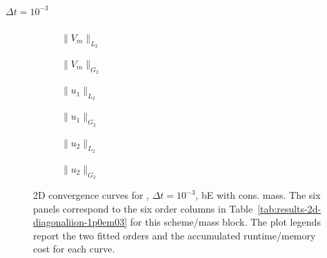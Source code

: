 \paragraph{$\Delta t=10^{-3}$}

\begin{figure}[p]
\centering
\begin{subfigure}{0.485\linewidth}
\centering
{}
\caption{$\|V_m\|_{L_2}$}
\label{fig:results-2d-diagonaliion-1p0em03-backwardeuler-consistent-a}
\end{subfigure}
\hfill
\begin{subfigure}{0.485\linewidth}
\centering
{}
\caption{$\|V_m\|_{G_2}$}
\label{fig:results-2d-diagonaliion-1p0em03-backwardeuler-consistent-b}
\end{subfigure}
\par\vspace{0.8em}
\begin{subfigure}{0.485\linewidth}
\centering
{}
\caption{$\|u_1\|_{L_2}$}
\label{fig:results-2d-diagonaliion-1p0em03-backwardeuler-consistent-c}
\end{subfigure}
\hfill
\begin{subfigure}{0.485\linewidth}
\centering
{}
\caption{$\|u_1\|_{G_2}$}
\label{fig:results-2d-diagonaliion-1p0em03-backwardeuler-consistent-d}
\end{subfigure}
\par\vspace{0.8em}
\begin{subfigure}{0.485\linewidth}
\centering
{}
\caption{$\|u_2\|_{L_2}$}
\label{fig:results-2d-diagonaliion-1p0em03-backwardeuler-consistent-e}
\end{subfigure}
\hfill
\begin{subfigure}{0.485\linewidth}
\centering
{}
\caption{$\|u_2\|_{G_2}$}
\label{fig:results-2d-diagonaliion-1p0em03-backwardeuler-consistent-f}
\end{subfigure}
\caption{2D convergence curves for , $\Delta t=10^{-3}$, bE with cons. mass. The six panels correspond to the six order columns in Table~\ref{tab:results-2d-diagonaliion-1p0em03} for this scheme/mass block. The plot legends report the two fitted orders and the accumulated runtime/memory cost for each curve.}
\label{fig:results-2d-diagonaliion-1p0em03-backwardeuler-consistent}
\end{figure}
\FloatBarrier

